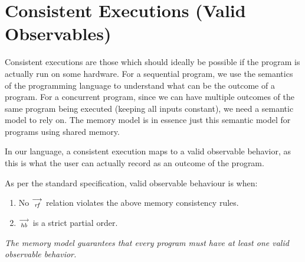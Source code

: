 

   \section{Consistent Executions (Valid Observables)}
      
      Consistent executions are those which should ideally be possible if the program is actually run on some hardware. 
      For a sequential program, we use the semantics of the programming language to understand what can be the outcome of a program. 
      For a concurrent program, since we can have multiple outcomes of the same program being executed (keeping all inputs constant), we need a semantic model to rely on. 
      The memory model is in essence just this semantic model for programs using shared memory.
      
      In our language, a consistent execution maps to a valid observable behavior, as this is what the user can actually record as an outcome of the program. 
   
      As per the standard specification, valid observable behaviour is when\footnotemark:
        \begin{enumerate}
           \item No $\stackrel{\longrightarrow}{_\textit{rf}}$ relation violates the above memory consistency rules.
           \item $\stackrel{\longrightarrow}{_\textit{hb}}$ is a strict partial order.
        \end{enumerate} 

        \textit{The memory model guarantees that every program must have at least one valid observable behavior.}